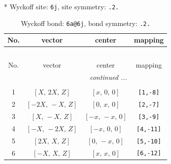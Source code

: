 \documentclass[fleqn,8pt]{jsarticle}
\begin{document}
* Wyckoff site: {\tt 6j}, site symmetry: {\tt .2.}
\renewcommand{\arraystretch}{1.2}
\begin{longtable}{cccc}
\caption{Wyckoff bond: {\tt 6a@6j}, bond symmetry: {\tt .2.}}
 \\
 \hline \hline
No. & vector & center & mapping \\ \hline \endfirsthead

\multicolumn{3}{l}{\tablename\ \thetable{}} \\
 \hline \hline
No. & vector & center & mapping \\ \hline \endhead

 \hline \hline
\multicolumn{3}{r}{\footnotesize\it continued ...} \\ \endfoot

 \hline \hline
\multicolumn{3}{r}{} \\ \endlastfoot

1 & $\left[ X,\, 2 X,\, Z \right]$ & $\left[ x,\, 0,\, 0 \right]$ & {\tt [1,-8]} \\ \hline
2 & $\left[ - 2 X,\, - X,\, Z \right]$ & $\left[ 0,\, x,\, 0 \right]$ & {\tt [2,-7]} \\ \hline
3 & $\left[ X,\, - X,\, Z \right]$ & $\left[ - x,\, - x,\, 0 \right]$ & {\tt [3,-9]} \\ \hline
4 & $\left[ - X,\, - 2 X,\, Z \right]$ & $\left[ - x,\, 0,\, 0 \right]$ & {\tt [4,-11]} \\ \hline
5 & $\left[ 2 X,\, X,\, Z \right]$ & $\left[ 0,\, - x,\, 0 \right]$ & {\tt [5,-10]} \\ \hline
6 & $\left[ - X,\, X,\, Z \right]$ & $\left[ x,\, x,\, 0 \right]$ & {\tt [6,-12]} \\
\end{longtable}
\renewcommand{\arraystretch}{1.2}
\end{document}
